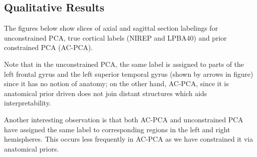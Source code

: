 \documentclass{llncs}
\begin{document}
{\subsection{Qualitative Results}

The figures below show slices of axial and sagittal section labelings for unconstrained PCA, true cortical labels (NIREP and LPBA40) and prior constrained PCA (AC-PCA).


Note that in the unconstrained PCA, the same label is assigned to parts of the left frontal gyrus and the left superior temporal gyrus (shown by arrows in figure) since it has no notion of anatomy; on the other hand, AC-PCA, since it is anatomical prior driven does not join distant structures which aids interpretability.

Another interesting observation is that both AC-PCA and unconstrained PCA have assigned  the same label to corresponding regions in the left and right hemispheres. This occurs less frequently in AC-PCA as we have constrained it via anatomical priors.  %

}
\end{document}

